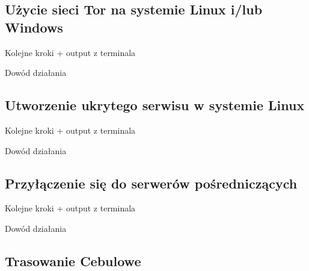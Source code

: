 \subsection{Użycie sieci Tor na systemie Linux i/lub Windows}
\begin{description}
 \item Kolejne kroki + output z terminala
 \item Dowód działania
\end{description}

\subsection{Utworzenie ukrytego serwisu w systemie Linux}
\begin{description}
 \item Kolejne kroki + output z terminala
 \item Dowód działania
\end{description}

\subsection{Przyłączenie się do serwerów pośredniczących}
\begin{description}
 \item Kolejne kroki + output z terminala
 \item Dowód działania
\end{description}

\subsection{Trasowanie Cebulowe}